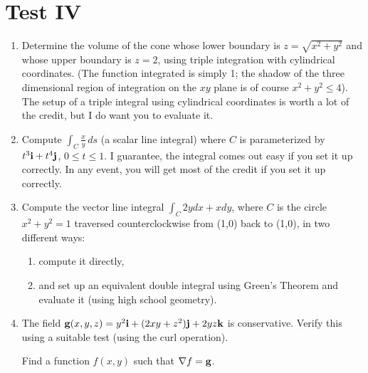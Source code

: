\documentclass[12pt]{article}
\begin{document}
\section{Test IV}


\begin{enumerate}

\item   Determine the volume of the cone whose lower boundary is $z=\sqrt{x^2+y^2}$ and whose upper boundary is $z=2$, using triple integration with cylindrical coordinates.  (The function integrated is simply 1;  the shadow of the three dimensional region of integration on the $xy$ plane  is of course $x^2+y^2 \leq 4$).  The setup of a triple integral using cylindrical coordinates is worth a lot of the credit, but I do want you to evaluate it.

\newpage

\item  Compute $\int_C \frac xy \, ds$ (a scalar line integral) where $C$ is parameterized by $t^3{\bf i} + t^4{\bf j}$, $0 \leq t \leq 1$.  I guarantee, the integral comes out easy if you set it up correctly.  In any event, you will get most of the credit if you set it up correctly.

\newpage

\item  Compute the vector line integral $\int_C 2ydx + xdy$, where $C$ is the circle $x^2+y^2=1$ traversed counterclockwise from (1,0) back to (1,0), in two different ways:  

\begin{enumerate}

\item compute it directly, 

\vspace{2.5 in}

\item and set up an equivalent double integral using Green's Theorem and evaluate it (using high school geometry).


\end{enumerate}

\newpage

\item  The field ${\bf g}(x,y,z)=y^2{\bf i} +(2xy + z^2){\bf j}+2yz{\bf k}$ is conservative.   Verify this using a suitable test (using the curl operation).

\vspace{1 in}

Find a function $f(x,y)$ such that $\nabla f = {\bf g}$.


\end{enumerate}
\end{document}
